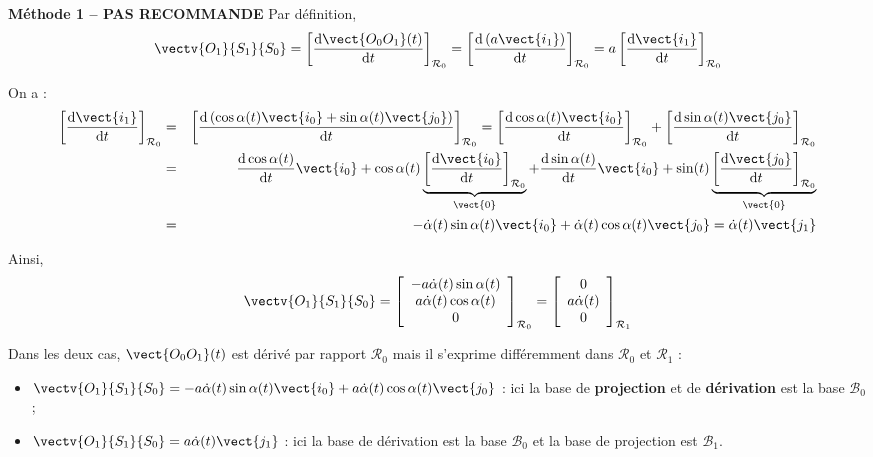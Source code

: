 \ifprof
\begin{corrige}


\textbf{Méthode 1 -- PAS RECOMMANDE }
Par définition, 
$$
\vectv{O_1}{S_1}{S_0} 
= \left[\dfrac{\text{d}\vect{O_0O_1}(t)}{\text{d}t}\right]_{\mathcal{R}_0}
= \left[\dfrac{\text{d} \left(a \vect{i_1}\right) }{\text{d}t}\right]_{\mathcal{R}_0}
= a \left[\dfrac{\text{d}  \vect{i_1} }{\text{d}t}\right]_{\mathcal{R}_0}
$$

On a :
\begin{eqnarray*}
\left[\dfrac{\text{d}  \vect{i_1} }{\text{d}t}\right]_{\mathcal{R}_0}
&=&\left[\dfrac{\text{d} \left(\cos\alpha(t)\vect{i_0}+\sin\alpha(t)\vect{j_0} \right)}{\text{d}t}\right]_{\mathcal{R}_0}
=\left[\dfrac{\text{d}  \cos\alpha(t)\vect{i_0}}{\text{d}t}\right]_{\mathcal{R}_0}
+\left[\dfrac{\text{d}  \sin\alpha(t)\vect{j_0} }{\text{d}t}\right]_{\mathcal{R}_0}\\
& = & 
\dfrac{\text{d} \cos\alpha(t)}{\text{d}t} \vect{i_0}  
+\cos\alpha(t)\underbrace{\left[\dfrac{\text{d}  \vect{i_0}}{\text{d}t}\right]_{\mathcal{R}_0}}_{\vect{0}}
+\dfrac{\text{d} \sin\alpha(t)}{\text{d}t} \vect{i_0}  
+\sin(t)\underbrace{\left[\dfrac{\text{d}  \vect{j_0}}{\text{d}t}\right]_{\mathcal{R}_0}}_{\vect{0}}\\
& = & -\dot{\alpha}(t)\sin\alpha(t) \vect{i_0}   + \dot{\alpha}(t)\cos\alpha(t) \vect{j_0}  = 
\dot{\alpha}(t)\vect{j_1}
\end{eqnarray*}

Ainsi,
$$
\vectv{O_1}{S_1}{S_0} 
= \left[\begin{array}{c} 
-a\dot{\alpha}(t)\sin\alpha(t) \\
a \dot{\alpha}(t)\cos\alpha(t) \\
0 \end{array}\right]_{\mathcal{R}_0}
=\left[\begin{array}{c} 0 \\ a\dot{\alpha}(t) \\ 0\end{array}\right]_{\mathcal{R}_1}
$$

Dans les deux cas, $\vect{O_0O_1}(t)$ est dérivé par rapport $\mathcal{R}_0$ mais il s'exprime différemment dans $\mathcal{R}_0$ et $\mathcal{R}_1$ :
\begin{itemize}
\item $\vectv{O_1}{S_1}{S_0} = -a\dot{\alpha}(t)\sin\alpha(t) \vect{i_0}   + a\dot{\alpha}(t) \cos\alpha(t) \vect{j_0}$ : ici la base de \textbf{projection} et de \textbf{dérivation} est la base $\mathcal{B}_0$;
\item $\vectv{O_1}{S_1}{S_0} = a\dot{\alpha}(t)\vect{j_1}$ : ici la base de dérivation est la base $\mathcal{B}_0$ et la base de projection est $\mathcal{B}_1$.
\end{itemize}



\end{corrige}
